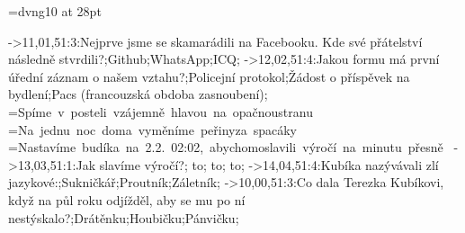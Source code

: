 \def\DevnagVersion{2.17}
\font\qanepali=dvng10 at 28pt
\def\nepqa#1{{\qanepali \dnnum #1}}






%

\def\lettertable#1#2{\ifcase#1
\switchletter#2:K,ů,v,a,2, ;\or %
\switchletter#2:l,r,i,R,\O, ;\or %
\switchletter#2:e,k,/,t,1+1, ;\or %
\switchletter#2:m,o,P,Y,6, ;\or %
\switchletter#2: , , , , , ;\or %
\switchletter#2:V,x, , , , ;\fi %
}

->11,01,51:3:Nejprve jsme se skamarádili na Facebooku. Kde své přátelství následně stvrdili?;Github;WhatsApp;ICQ;%
->12,02,51:4:Jakou formu má první úřední záznam o našem vztahu?;Policejní protokol;Žádost o příspěvek na bydlení;Pacs (francouzská obdoba zasnoubení);%
    =\vbox{\questionfont\baselineskip=32pt\hbox{Spíme v posteli vzájemně hlavou na opačnou}\hbox{stranu}\hbox{~}}
    =\vbox{\questionfont\baselineskip=32pt\hbox{Na jednu noc doma vyměníme peřiny}\hbox{za spacáky}\hbox{~}}
    =\vbox{\questionfont\baselineskip=32pt\hbox{Nastavíme budíka na 2.2.\ 02:02, abychom}\hbox{oslavili výročí na minutu přesně}\hbox{~}}
->13,03,51:1:Jak slavíme výročí?;{ \vbox to};{ \vbox to};{ \vbox to};%
->14,04,51:4:Kubíka nazývávali zlí jazykové:;Sukničkář;Proutník;Záletník;%
->10,00,51:3:Co dala Terezka Kubíkovi, když na půl roku odjížděl, aby se mu po ní nestýskalo?;Drátěnku;Houbičku;Pánvičku;%

